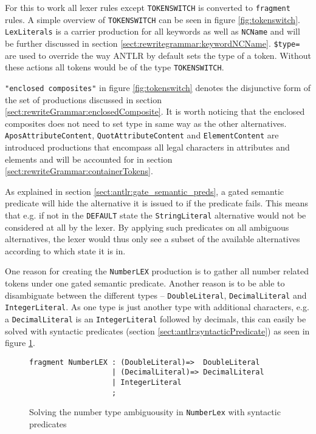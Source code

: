 For this to work all lexer rules except \verb!TOKENSWITCH! is converted to \verb!fragment! rules. A simple overview of \verb!TOKENSWITCH! can be seen in figure \ref{fig:tokenswitch}. \verb!LexLiterals! is a carrier production for all keywords as well as \verb!NCName! and will be further discussed in section \ref{sect:rewritegrammar:keywordNCName}. \verb!$type=! are used to override the way ANTLR by default sets the type of a token. Without these actions all tokens would be of the type \verb!TOKENSWITCH!.

\verb!"enclosed composites"! in figure \ref{fig:tokenswitch} denotes the disjunctive form of the set of productions discussed in section \ref{sect:rewriteGrammar:enclosedComposite}. It is worth noticing that the enclosed composites does not need to set type in same way as the other alternatives. \verb!AposAttributeContent!, \verb!QuotAttributeContent! and \verb!ElementContent! are introduced productions that encompass all legal characters in attributes and elements and will be accounted for in section \ref{sect:rewriteGrammar:containerTokens}.

As explained in section \ref{sect:antlr:gate_semantic_preds}, a gated semantic predicate will hide the alternative it is issued to if the predicate fails. This means that e.g. if not in the \verb!DEFAULT! state the \verb!StringLiteral! alternative would not be considered at all by the lexer. By applying such predicates on all ambiguous alternatives, the lexer would thus only see a subset of the available alternatives according to which state it is in.

One reason for creating the \verb!NumberLEX! production is to gather all number related tokens under one gated semantic predicate. Another reason is to be able to disambiguate between the different types -- \verb!DoubleLiteral!, \verb!DecimalLiteral! and \verb!IntegerLiteral!. As one type is just another type with additional characters, e.g. a \verb!DecimalLiteral! is an \verb!IntegerLiteral! followed by decimals, this can easily be solved with syntactic predicates (section \ref{sect:antlr:syntacticPredicate}) as seen in figure \ref{fig:numberLex}.

\begin{figure}[h!]
\begin{verbatim}
fragment NumberLEX : (DoubleLiteral)=>	DoubleLiteral
                   | (DecimalLiteral)=> DecimalLiteral
                   | IntegerLiteral
                   ;
\end{verbatim}
\caption[Solving the number type ambiguousity]{Solving the number type ambiguousity in \texttt{NumberLex} with syntactic predicates}
\label{fig:numberLex}
\end{figure}


